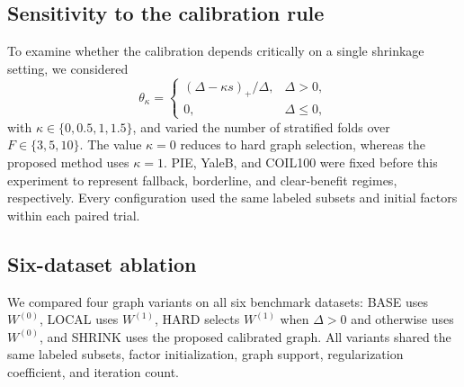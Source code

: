 \subsection{Sensitivity to the calibration rule}
\label{subsec:calibration_sensitivity}

To examine whether the calibration depends critically on a single
shrinkage setting, we considered
\[
\theta_{\kappa}=
\begin{cases}
(\Delta-\kappa s)_{+}/\Delta,&\Delta>0,\\
0,&\Delta\le0,
\end{cases}
\]
with \(\kappa\in\{0,0.5,1,1.5\}\), and varied the number of
stratified folds over \(F\in\{3,5,10\}\). The value \(\kappa=0\)
reduces to hard graph selection, whereas the proposed method uses
\(\kappa=1\). PIE, YaleB, and COIL100 were fixed before this experiment
to represent fallback, borderline, and clear-benefit regimes,
respectively. Every configuration used the same labeled subsets and
initial factors within each paired trial.


\subsection{Six-dataset ablation}
\label{subsec:ablation6}

We compared four graph variants on all six benchmark datasets:
BASE uses \(W^{(0)}\), LOCAL uses \(W^{(1)}\), HARD selects
\(W^{(1)}\) when \(\Delta>0\) and otherwise uses \(W^{(0)}\), and
SHRINK uses the proposed calibrated graph. All variants shared the same
labeled subsets, factor initialization, graph support, regularization
coefficient, and iteration count.


